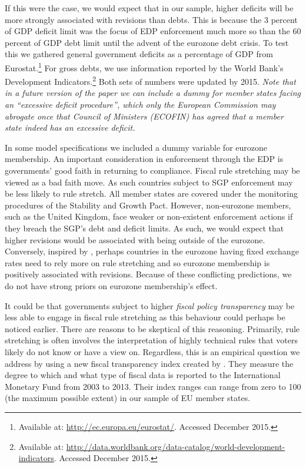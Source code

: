 \documentclass[]{article}
\begin{document}

If this were the case, we would expect that in our sample, higher deficits will be more strongly associated with revisions than debts. This is because the 3 percent of GDP deficit limit was the focus of EDP enforcement much more so than the 60 percent of GDP debt limit until the advent of the eurozone debt crisis. To test this we gathered general government deficits as a percentage of GDP from Eurostat.\footnote{Available at: \url{http://ec.europa.eu/eurostat/}. Accessed December 2015.} For gross debts, we use information reported by the World Bank's Development Indicators.\footnote{Available at: \url{http://data.worldbank.org/data-catalog/world-development-indicators}. Accessed December 2015.} Both sets of numbers were updated by 2015. \emph{Note that in a future version of the paper we can include a dummy for member states facing an ``excessive deficit procedure'', which only the European Commission may abrogate once that Council of Ministers (ECOFIN) has agreed that a member state indeed has an excessive deficit.}

In some model specifications we included a dummy variable for eurozone membership. An important consideration in enforcement through the EDP is governments' good faith in returning to compliance. Fiscal rule stretching may be viewed as a bad faith move. As such countries subject to SGP enforcement may be less likely to rule stretch. All member states are covered under the monitoring procedures of the Stability and Growth Pact. However, non-eurozone members, such as the United Kingdom, face weaker or non-existent enforcement actions if they breach the SGP's debt and deficit limits. As such, we would expect that higher revisions would be associated with being outside of the eurozone. Conversely, inspired by \cite{clark2003}, perhaps countries in the eurozone having fixed exchange rates need to rely more on rule stretching and so eurozone membership is positively associated with revisions. Because of these conflicting predictions, we do not have strong priors on eurozone membership's effect.

It could be that governments subject to higher \emph{fiscal policy transparency} may be less able to engage in fiscal rule stretching as this behaviour could perhaps be noticed earlier. There are reasons to be skeptical of this reasoning. Primarily, rule stretching is often involves the interpretation of highly technical rules that voters likely do not know or have a view on. Regardless, this is an empirical question we address by using a new fiscal transparency index created by \cite{Wang2015}. They measure the degree to which and what type of fiscal data is reported to the International Monetary Fund from 2003 to 2013. Their index ranges can range from zero to 100 (the maximum possible extent) in our sample of EU member states.
\end{document}
